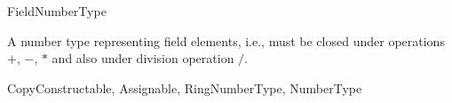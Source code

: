 \begin{ccRefConcept}{FieldNumberType}

A number type representing field elements, i.e., must be closed under
operations $+$, $-$, $*$ and also under division operation $/$.

\ccRefines
CopyConstructable, Assignable, RingNumberType, NumberType

\ccSeeAlso
{} \\
 \\

\end{ccRefConcept}
